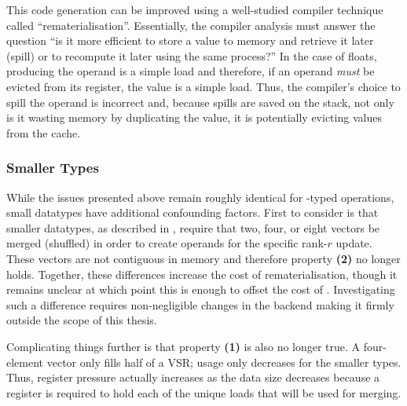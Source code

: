 \documentclass[\main/thesis.tex]{subfiles}
\begin{document}
This code generation can be improved using a well-studied compiler technique called ``\gls{rematerialisation}''.
Essentially, the compiler analysis must answer the question ``is it more efficient to store a value to memory and retrieve it later (\gls{spill}) or to recompute it later using the same process?''
In the case of floats, producing the operand is a simple load and therefore, if an operand \emph{must} be evicted from its register,  the value is a simple load.
Thus, the compiler's choice to spill the operand is incorrect and, because spills are saved on the stack, not only is it wasting memory by duplicating the value, it is potentially evicting values from the cache.

\subsubsection{Smaller Types}
While the issues presented above remain roughly identical for -typed operations, small datatypes have  additional confounding factors.
First to consider is that smaller datatypes, as described in , require that two, four, or eight vectors be merged (shuffled) in order to create operands for the specific rank-$r$ update.
These vectors are not contiguous in memory and therefore property \textbf{(2)} no longer holds.
Together, these differences increase the cost of \gls{rematerialisation}, though it remains unclear at which point this is enough to offset the cost of .
Investigating such a difference requires non-negligible changes in the backend making it firmly outside the scope of this thesis.

Complicating things further is that property \textbf{(1)} is also no longer true.
A four-element  vector only fills half of a VSR; usage only decreases for the smaller types.
Thus, register pressure actually increases as the data size decreases because a register is required to hold each of the unique loads that will be used for merging.
\end{document}
